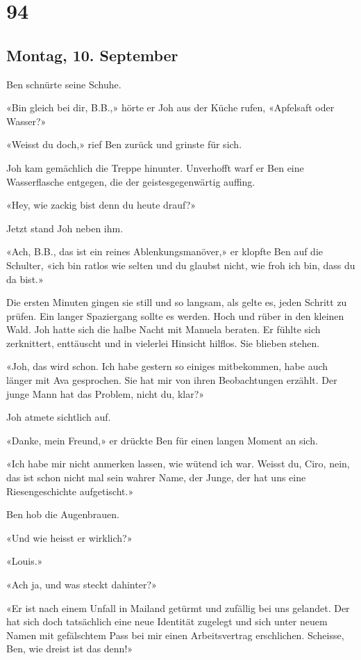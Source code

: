 \chapter{94}

\section{Montag, 10.
September}



Ben schnürte seine Schuhe.

«Bin gleich bei dir, B.B.,» hörte er Joh aus der Küche rufen, «Apfelsaft
oder Wasser?»

«Weisst du doch,» rief Ben zurück und grinste für sich.

Joh kam gemächlich die Treppe hinunter. Unverhofft warf er Ben eine
Wasserflasche entgegen, die der geistesgegenwärtig auffing.

«Hey, wie zackig bist denn du heute drauf?»

Jetzt stand Joh neben ihm.

«Ach, B.B., das ist ein reines Ablenkungsmanöver,» er klopfte Ben auf
die Schulter, «ich bin ratlos wie selten und du glaubst nicht, wie froh
ich bin, dass du da bist.»

Die ersten Minuten gingen sie still und so langsam, als gelte es, jeden
Schritt zu prüfen. Ein langer Spaziergang sollte es werden. Hoch und
rüber in den kleinen Wald.
Joh hatte sich die halbe Nacht mit Manuela beraten. Er fühlte sich
zerknittert, enttäuscht und in vielerlei Hinsicht hilflos.
Sie blieben stehen.

«Joh, das wird schon. Ich habe gestern so einiges mitbekommen, habe auch
länger mit Ava gesprochen. Sie hat mir von ihren Beobachtungen erzählt.
Der junge Mann hat das Problem, nicht du, klar?»

Joh atmete sichtlich auf.

«Danke, mein Freund,» er drückte Ben für einen langen Moment an sich.

«Ich habe mir nicht anmerken lassen, wie wütend ich war. Weisst du, Ciro,
nein, das ist schon nicht mal sein wahrer Name, der Junge, der hat uns
eine Riesengeschichte aufgetischt.»

Ben hob die Augenbrauen.

«Und wie heisst er wirklich?»

«Louis.»

«Ach ja, und was steckt dahinter?»

«Er ist nach einem Unfall in Mailand getürmt und zufällig bei uns
gelandet. Der hat sich doch tatsächlich eine neue Identität zugelegt und
sich unter neuem Namen mit gefälschtem Pass bei mir einen Arbeitsvertrag
erschlichen. Scheisse, Ben, wie dreist ist das denn!»

